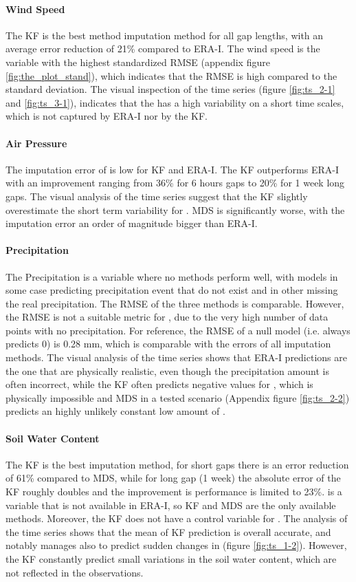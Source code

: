 \documentclass{article}
\begin{document}
\paragraph{Wind Speed} The KF is the best method imputation method for all gap lengths, with an average error reduction of 21\% compared to ERA-I. The wind speed is the variable with the highest standardized RMSE (appendix figure \ref{fig:the_plot_stand}), which indicates that the RMSE is high compared to the  standard deviation. The visual inspection of the time series (figure \ref{fig:ts_2-1} and \ref{fig:ts_3-1}), indicates that the  has a high variability on a short time scales, which is not captured by ERA-I nor by the KF.

\paragraph{Air Pressure} The imputation error of  is low for KF and ERA-I. The KF outperforms ERA-I with an improvement ranging from 36\% for 6 hours gaps to 20\% for 1 week long gaps. The visual analysis of the time series suggest that the KF slightly overestimate the short term variability for . MDS is significantly worse, with the imputation error an order of magnitude bigger than ERA-I.

\paragraph{Precipitation} The Precipitation is a variable where no methods perform well, with models in some case predicting precipitation event that do not exist and in other missing the real precipitation. The RMSE of the three methods is comparable. However, the RMSE is not a suitable metric for , due to the very high number of data points with no precipitation. For reference, the RMSE of a null model (i.e. always predicts 0) is 0.28 \si{mm}, which is comparable with the errors of all imputation methods. 
The visual analysis of the time series shows that ERA-I predictions are the one that are physically realistic, even though the precipitation amount is often incorrect, while the KF often predicts negative values for , which is physically impossible and MDS in a tested scenario (Appendix figure \ref{fig:ts_2-2}) predicts an highly unlikely constant low amount of .

\paragraph{Soil Water Content} The KF is the best imputation method, for short gaps there is an error reduction of 61\% compared to MDS, while for long gap (1 week) the absolute error of the KF roughly doubles and the improvement is performance is limited to 23\%.  is a variable that is not available in ERA-I, so KF and MDS are the only available methods. Moreover, the KF does not have a control variable for .
The analysis of the time series shows that the mean of KF prediction is overall accurate, and notably manages also to predict sudden changes in  (figure \ref{fig:ts_1-2}). However, the KF constantly predict small variations in the soil water content, which are not reflected in the observations.
\end{document}
